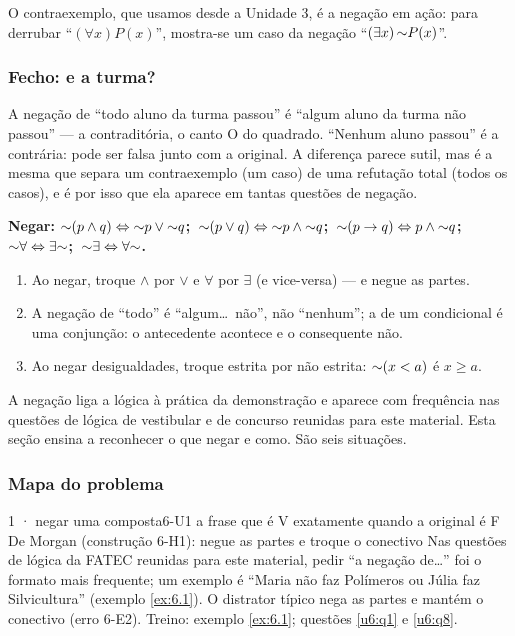 O contraexemplo, que usamos desde a Unidade 3, é a negação em ação: para derrubar \enquote{$(\forall x)P(x)$}, mostra-se um caso da negação \enquote{$(\exists x)\,{{\sim}}P(x)$}.

\subsubsection{Fecho: e a turma?}
A negação de \enquote{todo aluno da turma passou} é \enquote{algum aluno da turma não passou} — a contraditória, o canto O do quadrado. \enquote{Nenhum aluno passou} é a contrária: pode ser falsa junto com a original. A diferença parece sutil, mas é a mesma que separa um contraexemplo (um caso) de uma refutação total (todos os casos), e é por isso que ela aparece em tantas questões de negação.

\begin{paralembrar}\label{lembrar-u6}
\textbf{Negar: ${{\sim}}(p\wedge q)\Leftrightarrow{{\sim}}p\vee{{\sim}}q$;\ ${{\sim}}(p\vee q)\Leftrightarrow{{\sim}}p\wedge{{\sim}}q$;\ ${{\sim}}(p\rightarrow q)\Leftrightarrow p\wedge{{\sim}}q$;\ ${{\sim}}\forall\Leftrightarrow\exists{{\sim}}$;\ ${{\sim}}\exists\Leftrightarrow\forall{{\sim}}$.}
\begin{enumerate}[label=\arabic*.,leftmargin=1.4em]
  \item Ao negar, troque $\wedge$ por $\vee$ e $\forall$ por $\exists$ (e vice-versa) — e negue as partes.
  \item A negação de \enquote{todo} é \enquote{algum\ldots\ não}, não \enquote{nenhum}; a de um condicional é uma conjunção: o antecedente acontece e o consequente não.
  \item Ao negar desigualdades, troque estrita por não estrita: ${{\sim}}(x<a)$ é $x\ge a$.
\end{enumerate}
\end{paralembrar}

\OndeEUsado

A negação liga a lógica à prática da demonstração e aparece com frequência nas questões de lógica de vestibular e de concurso reunidas para este material. Esta seção ensina a reconhecer o que negar e como. São seis situações.

\subsubsection{Mapa do problema}

\begin{caso}{1 · negar uma composta}{6-U1}
{a frase que é V exatamente quando a original é F}
{De Morgan (construção 6-H1): negue as partes e troque o conectivo}
\reconhecer Nas questões de lógica da FATEC reunidas para este material, pedir \enquote{a negação de\ldots} foi o formato mais frequente; um exemplo é \enquote{Maria não faz Polímeros ou Júlia faz Silvicultura} (exemplo \ref{ex:6.1}). O distrator típico nega as partes e mantém o conectivo (erro 6-E2). Treino: exemplo \ref{ex:6.1}; questões \ref{u6:q1} e \ref{u6:q8}.
\end{caso}

